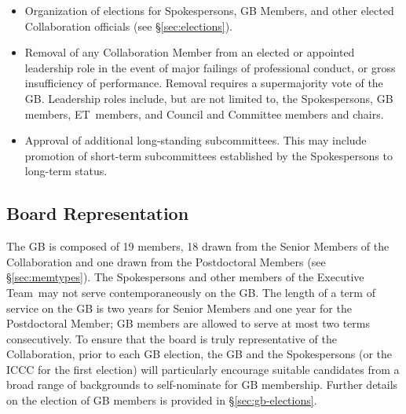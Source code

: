 \documentclass[12pt]{article}
\newcommand{\exec}{{Executive Team}}
\newcommand{\shorte}{{ET}}  %
\begin{document}
\begin{itemize}
\item Organization of elections for Spokespersons, GB Members, and other elected Collaboration officials (see \S\ref{sec:elections}).  

\item Removal of any Collaboration Member from an elected or appointed leadership role in the event of major failings of professional conduct, or gross insufficiency of performance.  Removal requires a supermajority vote of the GB.   Leadership roles include, but are not limited to, the Spokespersons, GB members, \shorte\ members, and Council and Committee members and chairs.  %


\item Approval of additional long-standing subcommittees.%
This may include promotion of short-term subcommittees established by the Spokespersons to long-term status. 


\end{itemize}


\subsection{Board Representation}
The GB is composed of 19 members, 18 drawn from the Senior Members of the Collaboration and one drawn from the Postdoctoral Members (see \S\ref{sec:memtypes}). The Spokespersons and other members of the \exec\ may not serve contemporaneously on the GB.  
The length of a term of service on the GB %
is two years for Senior Members and one year for the Postdoctoral Member; GB members are allowed to serve at most two terms consecutively.
To ensure that the board is truly representative of the Collaboration, prior to each GB election,  the GB and the Spokespersons (or the ICCC for the first election) will particularly encourage suitable candidates from a broad range of 
backgrounds to self-nominate  for GB membership.  Further details on the election of GB members is provided in  \S\ref{sec:gb-elections}.  
\end{document}
